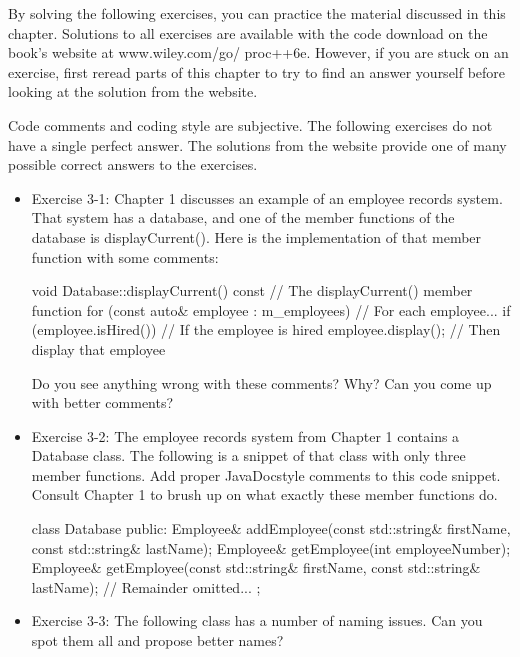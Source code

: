 By solving the following exercises, you can practice the material discussed in this chapter. Solutions to all exercises are available with the code download on the book’s website at www.wiley.com/go/ proc++6e. However, if you are stuck on an exercise, first reread parts of this chapter to try to find an answer yourself before looking at the solution from the website.

Code comments and coding style are subjective. The following exercises do not have a single perfect answer. The solutions from the website provide one of many possible correct answers to the exercises.


\begin{itemize}
\item
Exercise 3-1: Chapter 1 discusses an example of an employee records system. That system has a database, and one of the member functions of the database is displayCurrent(). Here is the implementation of that member function with some comments:

\begin{cpp}
void Database::displayCurrent() const // The displayCurrent() member function
{
    for (const auto& employee : m_employees) { // For each employee...
        if (employee.isHired()) { // If the employee is hired
            employee.display(); // Then display that employee
        }
    }
}
\end{cpp}

Do you see anything wrong with these comments? Why? Can you come up with better comments?


\item
Exercise 3-2: The employee records system from Chapter 1 contains a Database class. The following is a snippet of that class with only three member functions. Add proper JavaDocstyle comments to this code snippet. Consult Chapter 1 to brush up on what exactly these member functions do.

\begin{cpp}
class Database
{
    public:
    Employee& addEmployee(const std::string& firstName,
    const std::string& lastName);
    Employee& getEmployee(int employeeNumber);
    Employee& getEmployee(const std::string& firstName,
    const std::string& lastName);
    // Remainder omitted...
};
\end{cpp}

\item
Exercise 3-3: The following class has a number of naming issues. Can you spot them all and propose better names?


\end{itemize}
